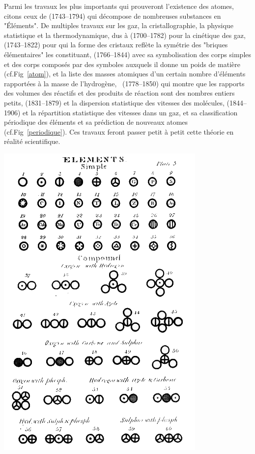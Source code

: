  Parmi les travaux les plus importants qui prouveront l'existence des atomes, citons ceux de  (\num{1743}--\num{1794}) qui décompose de nombreuses substances en "Éléments". De multiples travaux sur les gaz, la cristallographie, la physique statistique et la thermodynamique, dus à  (\num{1700}--\num{1782}) pour la cinétique des gaz,  (\num{1743}--\num{1822}) pour qui la forme des cristaux reflète la symétrie des "briques élémentaires" les constituant,  (\num{1766}--\num{1844}) avec sa symbolisation des corps simples et des corps composés par des symboles auxquels il donne un poids de matière (cf.Fig~\ref{atom}), et la liste des masses atomiques d'un certain nombre d'éléments rapportées à la masse de l'hydrogène, \hbox{ (\num{1778}--\num{1850})} qui montre que les rapports des volumes des réactifs et des produits de réaction sont des nombres entiers petits,  (\num{1831}--\num{1879}) et la dispersion statistique des vitesses des molécules,  (\num{1844}--\num{1906}) et la répartition statistique des vitesses dans un gaz,  et sa classification périodique des éléments et sa prédiction de nouveaux atomes (cf.Fig~\ref{periodique}). Ces travaux feront passer petit à petit cette théorie en réalité scientifique. 
 
\marginpar
{
	\includegraphics[width=\marginparwidth]{SM/Dalton.png}
    \label{atom}
}

